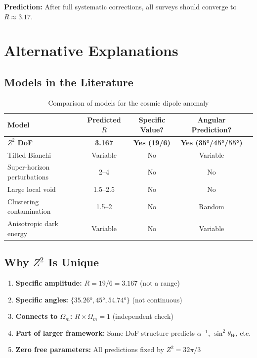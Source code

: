 \documentclass[12pt,a4paper]{article}
\begin{document}
\textbf{Prediction:} After full systematic corrections, all surveys should converge to $R \approx 3.17$.

\section{Alternative Explanations}

\subsection{Models in the Literature}

\begin{table}[H]
\centering
\caption{Comparison of models for the cosmic dipole anomaly}
\begin{tabular}{lcccc}
\toprule
Model & Predicted $R$ & Specific Value? & Angular Prediction? \\
\midrule
\textbf{$Z^2$ DoF} & \textbf{3.167} & \textbf{Yes (19/6)} & \textbf{Yes (35°/45°/55°)} \\
Tilted Bianchi & Variable & No & Variable \\
Super-horizon perturbations & 2--4 & No & No \\
Large local void & 1.5--2.5 & No & No \\
Clustering contamination & 1.5--2 & No & Random \\
Anisotropic dark energy & Variable & No & Variable \\
\bottomrule
\end{tabular}
\end{table}

\subsection{Why $Z^2$ Is Unique}

\begin{enumerate}
    \item \textbf{Specific amplitude:} $R = 19/6 = 3.167$ (not a range)
    \item \textbf{Specific angles:} $\{35.26°, 45°, 54.74°\}$ (not continuous)
    \item \textbf{Connects to $\Omega_m$:} $R \times \Omega_m = 1$ (independent check)
    \item \textbf{Part of larger framework:} Same DoF structure predicts $\alpha^{-1}$, $\sin^2\theta_W$, etc.
    \item \textbf{Zero free parameters:} All predictions fixed by $Z^2 = 32\pi/3$
\end{enumerate}
\end{document}
